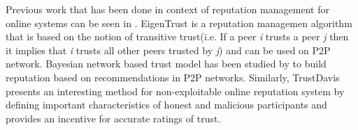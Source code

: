 \documentclass[a4paper,11pt,dvipsnames]{article}
\begin{document}
	Previous work that has been done in context of reputation management 
	for online systems can be seen in \cite{literature1}\cite{literature2}
	\cite{COIN:COIN202}. EigenTrust \cite{ilprints562} is a reputation managemen 
	algorithm that is based on the notion of transitive trust(i.e. If a peer 
	\textit{i} trusts a peer \textit{j} then it implies that \textit{i} trusts 
	all other peers trusted by \textit{j}) and can be used on P2P network. 
	Bayesian network based trust model has been studied 
	by \cite{1231515} to build reputation based on recommendations in 
	P2P networks. Similarly, TrustDavis \cite{trustdavis} presents 
	an interesting method for non-exploitable online reputation system by 
	defining important characteristics of honest and malicious participants 
	and provides an incentive for accurate ratings of trust. 


	

\end{document}
